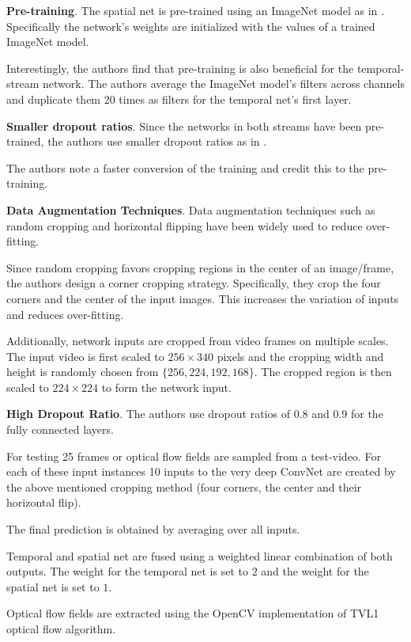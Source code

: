 \textbf{Pre-training}.
The spatial net is pre-trained using an ImageNet model as in \cite{simonyan_two-stream_2014}.
Specifically the network's weights are initialized with the values of a trained ImageNet model.

Interestingly, the authors find that pre-training is also beneficial for the temporal-stream network.
The authors average the ImageNet model's filters across channels and duplicate them 20 times as filters for the temporal net's first layer.

\textbf{Smaller dropout ratios}.
Since the networks in both streams have been pre-trained, the authors use smaller dropout ratios as in \cite{simonyan_two-stream_2014}.

The authors note a faster conversion of the training and credit this to the pre-training.

\textbf{Data Augmentation Techniques}.
Data augmentation techniques such as random cropping and horizontal flipping have been widely used to reduce over-fitting.

Since random cropping favors cropping regions in the center of an image/frame, the authors design a corner cropping strategy.
Specifically, they crop the four corners and the center of the input images.
This increases the variation of inputs and reduces over-fitting.

Additionally, network inputs are cropped from video frames on multiple scales.
The input video is first scaled to $256 \times 340$ pixels and the cropping width and height is randomly chosen from $\{256, 224, 192, 168\}$.
The cropped region is then scaled to $224 \times 224$ to form the network input.

\textbf{High Dropout Ratio}.
The authors use dropout ratios of 0.8 and 0.9 for the fully connected layers.

For testing 25 frames or optical flow fields are sampled from a test-video.
For each of these input instances 10 inputs to the very deep ConvNet are created by the above mentioned cropping method (four corners, the center and their horizontal flip).

The final prediction is obtained by averaging over all inputs.

Temporal and spatial net are fused using a weighted linear combination of both outputs.
The weight for the temporal net is set to $2$ and the weight for the spatial net is set to $1$.

Optical flow fields are extracted using the OpenCV implementation of TVL1 optical flow algorithm.

